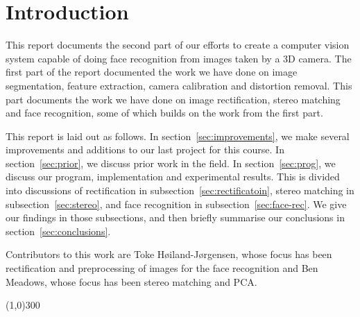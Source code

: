 
\section{Introduction}
This report documents the second part of our efforts to create a computer vision
system capable of doing face recognition from images taken by a 3D camera. The
first part of the report documented the work we have done on image segmentation,
feature extraction, camera calibration and distortion removal. This part
documents the work we have done on image rectification, stereo matching and face
recognition, some of which builds on the work from the first part.

This report is laid out as follows. In section~\ref{sec:improvements}, we make
several improvements and additions to our last project for this course. In
section~\ref{sec:prior}, we discuss prior work in the field. In
section~\ref{sec:prog}, we discuss our program, implementation and experimental
results. This is divided into discussions of rectification in
subsection~\ref{sec:rectificatoin}, stereo matching in
subsection~\ref{sec:stereo}, and face recognition in
subsection~\ref{sec:face-rec}. We give our findings in those subsections, and
then briefly summarise our conclusions in section~\ref{sec:conclusions}.

Contributors to this work are Toke Høiland-Jørgensen, whose focus has been
rectification and preprocessing of images for the face recognition and
Ben Meadows, whose focus has been stereo matching and PCA.

\begin{center}
\line(1,0){300}
\end{center}
